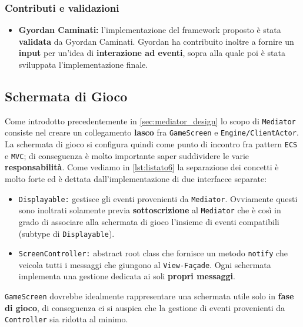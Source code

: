 \subsubsection{Contributi e validazioni}
\begin{itemize}
	\item{\textbf{Gyordan Caminati:}} l'implementazione del framework proposto è stata \textbf{validata} da Gyordan Caminati. Gyordan ha contribuito inoltre a fornire un \textbf{input} per un'idea di \textbf{interazione ad eventi}, sopra alla quale poi è stata sviluppata l'implementazione finale.
\end{itemize}

\subsection{Schermata di Gioco}
\label{subsec:game_screen}
Come introdotto precedentemente in \ref{sec:mediator_design} lo scopo di \texttt{Mediator} consiste nel creare un collegamento \textbf{lasco} fra \texttt{GameScreen} e \texttt{Engine/ClientActor}. La schermata di gioco si configura quindi come punto di incontro fra pattern \texttt{ECS} e \texttt{MVC}; di conseguenza è molto importante saper suddividere le varie \textbf{responsabilità}. Come vediamo in \ref{lst:listato6} la separazione dei concetti è molto forte ed è dettata dall'implementazione di due interfacce separate:
\begin{itemize}
	\item{\texttt{Displayable:}} gestisce gli eventi provenienti da \texttt{Mediator}. Ovviamente questi sono inoltrati solamente previa \textbf{sottoscrizione} al \texttt{Mediator} che è così in grado di associare alla schermata di gioco l'insieme di eventi compatibili (subtype di \texttt{Displayable}).
	\item{\texttt{ScreenController:}} abstract root class che fornisce un metodo \texttt{notify} che veicola tutti i messaggi che giungono al \texttt{View-Façade}. Ogni schermata implementa una gestione dedicata ai soli \textbf{propri messaggi}.
\end{itemize}
\texttt{GameScreen} dovrebbe idealmente rappresentare una schermata utile solo in \textbf{fase di gioco}, di conseguenza ci si auspica che la gestione di eventi provenienti da \texttt{Controller} sia ridotta al minimo.



